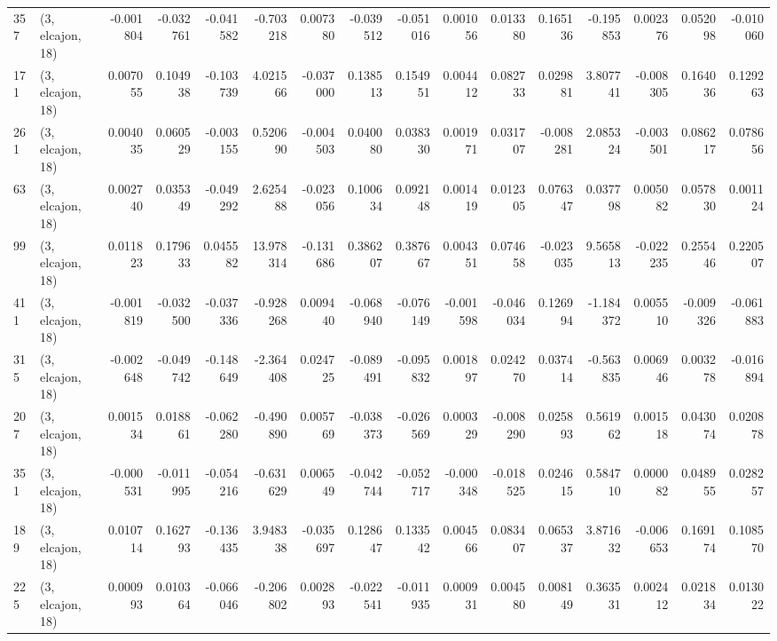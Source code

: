 \begin{tabular}{llrrrrrrrrrrrrrr}
357 &  (3, elcajon, 18) &  -0.001804 & -0.032761 & -0.041582 &  -0.703218 &  0.007380 &  -0.039512 & -0.051016 &  0.001056 &  0.013380 &  0.165136 &    -0.195853 &   0.002376 &   0.052098 &  -0.010060 \\
171 &  (3, elcajon, 18) &   0.007055 &  0.104938 & -0.103739 &   4.021566 & -0.037000 &   0.138513 &  0.154951 &  0.004412 &  0.082733 &  0.029881 &     3.807741 &  -0.008305 &   0.164036 &   0.129263 \\
261 &  (3, elcajon, 18) &   0.004035 &  0.060529 & -0.003155 &   0.520690 & -0.004503 &   0.040080 &  0.038330 &  0.001971 &  0.031707 & -0.008281 &     2.085324 &  -0.003501 &   0.086217 &   0.078656 \\
63  &  (3, elcajon, 18) &   0.002740 &  0.035349 & -0.049292 &   2.625488 & -0.023056 &   0.100634 &  0.092148 &  0.001419 &  0.012305 &  0.076347 &     0.037798 &   0.005082 &   0.057830 &   0.001124 \\
99  &  (3, elcajon, 18) &   0.011823 &  0.179633 &  0.045582 &  13.978314 & -0.131686 &   0.386207 &  0.387667 &  0.004351 &  0.074658 & -0.023035 &     9.565813 &  -0.022235 &   0.255446 &   0.220507 \\
411 &  (3, elcajon, 18) &  -0.001819 & -0.032500 & -0.037336 &  -0.928268 &  0.009440 &  -0.068940 & -0.076149 & -0.001598 & -0.046034 &  0.126994 &    -1.184372 &   0.005510 &  -0.009326 &  -0.061883 \\
315 &  (3, elcajon, 18) &  -0.002648 & -0.049742 & -0.148649 &  -2.364408 &  0.024725 &  -0.089491 & -0.095832 &  0.001897 &  0.024270 &  0.037414 &    -0.563835 &   0.006946 &   0.003278 &  -0.016894 \\
207 &  (3, elcajon, 18) &   0.001534 &  0.018861 & -0.062280 &  -0.490890 &  0.005769 &  -0.038373 & -0.026569 &  0.000329 & -0.008290 &  0.025893 &     0.561962 &   0.001518 &   0.043074 &   0.020878 \\
351 &  (3, elcajon, 18) &  -0.000531 & -0.011995 & -0.054216 &  -0.631629 &  0.006549 &  -0.042744 & -0.052717 & -0.000348 & -0.018525 &  0.024615 &     0.584710 &   0.000082 &   0.048955 &   0.028257 \\
189 &  (3, elcajon, 18) &   0.010714 &  0.162793 & -0.136435 &   3.948338 & -0.035697 &   0.128647 &  0.133542 &  0.004566 &  0.083407 &  0.065337 &     3.871632 &  -0.006653 &   0.169174 &   0.108570 \\
225 &  (3, elcajon, 18) &   0.000993 &  0.010364 & -0.066046 &  -0.206802 &  0.002893 &  -0.022541 & -0.011935 &  0.000931 &  0.004580 &  0.008149 &     0.363531 &   0.002412 &   0.021834 &   0.013022 \\

\end{tabular}
